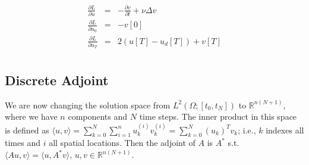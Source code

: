 \documentclass[10pt]{article}
\begin{document}
\begin{eqnarray}
\frac{\partial L}{\partial  u}&=&- \frac{\partial v}{\partial t}  +\nu\Delta  v \\
\frac{\partial L}{\partial  u_0}&=&- v[0]\\ \nonumber
\frac{\partial L}{\partial  u_T}&=&2( u[T]- u_d[T])+ v[T]\\ \nonumber
\end{eqnarray}

\subsection{Discrete Adjoint \label{sec:adj:discrete}} 

We are now changing the solution space from $L^2(\Omega;[t_0,t_N])$ to
$\mathbb{R}^{n(N+1)}$, where we have $n$ components and $N$ time
steps. The inner product in this space is defined as $\langle u , v
\rangle = \sum_{k=0}^N \sum_{i=1}^{n} u_k^{(i)} v_k^{(i)} =
\sum_{k=0}^N  (u_k)^T v_k$; i.e., $k$ indexes all times and $i$ all
spatial locations. Then the adjoint of $A$ is $A^*$ s.t. $\langle A u , v
\rangle = \langle u , A^* v \rangle $, $u,v \in \mathbb{R}^{n(N+1)}$.
\end{document}
